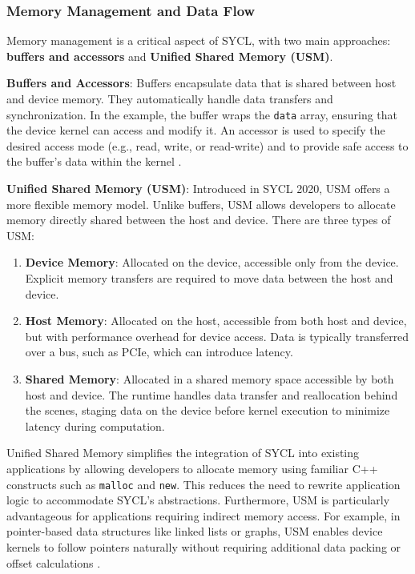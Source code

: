 \subsubsection{Memory Management and Data Flow}
\label{sec:sycl-memory-management}

Memory management is a critical aspect of SYCL, with two main approaches: \textbf{buffers and accessors} and \textbf{Unified Shared
Memory (USM)}.

\textbf{Buffers and Accessors}: Buffers encapsulate data that is shared between host and device memory. They automatically handle
data transfers and synchronization. In the example, the buffer wraps the \texttt{data} array, ensuring that the device kernel can
access and modify it. An accessor is used to specify the desired access mode (e.g., read, write, or read-write) and to provide safe
access to the buffer's data within the kernel \cite{SYCL2020}.

\textbf{Unified Shared Memory (USM)}: Introduced in SYCL 2020, USM offers a more flexible memory model. Unlike buffers, USM allows
developers to allocate memory directly shared between the host and device. There are three types of USM:
\begin{enumerate}
    \item \textbf{Device Memory}: Allocated on the device, accessible only from the device. Explicit memory transfers are required to
    move data between the host and device.
    \item \textbf{Host Memory}: Allocated on the host, accessible from both host and device, but with performance overhead for device
    access. Data is typically transferred over a bus, such as PCIe, which can introduce latency.
    \item \textbf{Shared Memory}: Allocated in a shared memory space accessible by both host and device. The runtime handles data
    transfer and reallocation behind the scenes, staging data on the device before kernel execution to minimize latency during
    computation.
\end{enumerate}

Unified Shared Memory simplifies the integration of SYCL into existing applications by allowing developers to allocate memory using
familiar C++ constructs such as \texttt{malloc} and \texttt{new}. This reduces the need to rewrite application logic to accommodate
SYCL’s abstractions. Furthermore, USM is particularly advantageous for applications requiring indirect memory access. For example, in
pointer-based data structures like linked lists or graphs, USM enables device kernels to follow pointers naturally without requiring
additional data packing or offset calculations \cite{reinders2020data, SYCL2020}.



